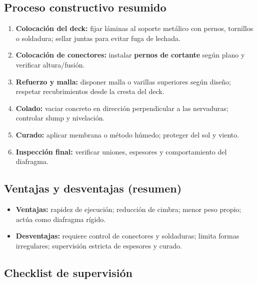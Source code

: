 \documentclass[12pt]{article}
\begin{document}
 \subsection*{Proceso constructivo resumido}
 \begin{enumerate}[leftmargin=*, itemsep=2pt]
 	\item \textbf{Colocación del deck:} fijar láminas al soporte metálico con pernos, tornillos o soldadura; sellar juntas para evitar fuga de lechada.
 	\item \textbf{Colocación de conectores:} instalar \textbf{pernos de cortante} según plano y verificar altura/fusión.
 	\item \textbf{Refuerzo y malla:} disponer malla o varillas superiores según diseño; respetar recubrimientos desde la cresta del deck.
 	\item \textbf{Colado:} vaciar concreto en dirección perpendicular a las nervaduras; controlar slump y nivelación.
 	\item \textbf{Curado:} aplicar membrana o método húmedo; proteger del sol y viento.
 	\item \textbf{Inspección final:} verificar uniones, espesores y comportamiento del diafragma.
 \end{enumerate}
 
 \subsection*{Ventajas y desventajas (resumen)}
 \begin{itemize}[leftmargin=*, itemsep=2pt]
 	\item \textbf{Ventajas:} rapidez de ejecución; reducción de cimbra; menor peso propio; actúa como diafragma rígido.
 	\item \textbf{Desventajas:} requiere control de conectores y soldaduras; limita formas irregulares; supervisión estricta de espesores y curado.
 \end{itemize}
 
 \subsection{Checklist de supervisión}
 
\end{document}
